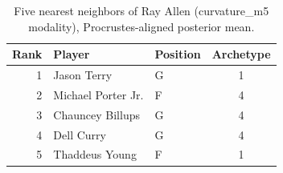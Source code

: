 \begin{table}[htbp]
  \centering\small
  \begin{tabular}{rllc}
    \toprule
    Rank & Player & Position & Archetype \\
    \midrule
    1 & Jason Terry & G & 1 \\
    2 & Michael Porter Jr. & F & 4 \\
    3 & Chauncey Billups & G & 4 \\
    4 & Dell Curry & G & 4 \\
    5 & Thaddeus Young & F & 1 \\
    \bottomrule
  \end{tabular}
  \caption{Five nearest neighbors of Ray Allen (curvature_m5 modality), Procrustes-aligned posterior mean.}
  \label{tab:Ray_Allen_neighbors_curvature_m5}
\end{table}

